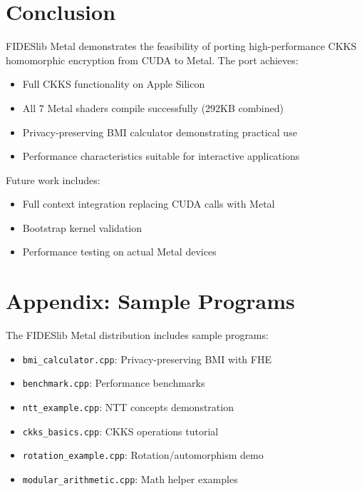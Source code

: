 \documentclass[11pt,oneside]{article}
\begin{document}
\section{Conclusion}

FIDESlib Metal demonstrates the feasibility of porting high-performance CKKS homomorphic encryption from CUDA to Metal. The port achieves:
\begin{itemize}
    \item Full CKKS functionality on Apple Silicon
    \item All 7 Metal shaders compile successfully (292KB combined)
    \item Privacy-preserving BMI calculator demonstrating practical use
    \item Performance characteristics suitable for interactive applications
\end{itemize}

Future work includes:
\begin{itemize}
    \item Full context integration replacing CUDA calls with Metal
    \item Bootstrap kernel validation
    \item Performance testing on actual Metal devices
\end{itemize}




\section*{Appendix: Sample Programs}

The FIDESlib Metal distribution includes sample programs:

\begin{itemize}
    \item \texttt{bmi\_calculator.cpp}: Privacy-preserving BMI with FHE
    \item \texttt{benchmark.cpp}: Performance benchmarks
    \item \texttt{ntt\_example.cpp}: NTT concepts demonstration
    \item \texttt{ckks\_basics.cpp}: CKKS operations tutorial
    \item \texttt{rotation\_example.cpp}: Rotation/automorphism demo
    \item \texttt{modular\_arithmetic.cpp}: Math helper examples
\end{itemize}
\end{document}
